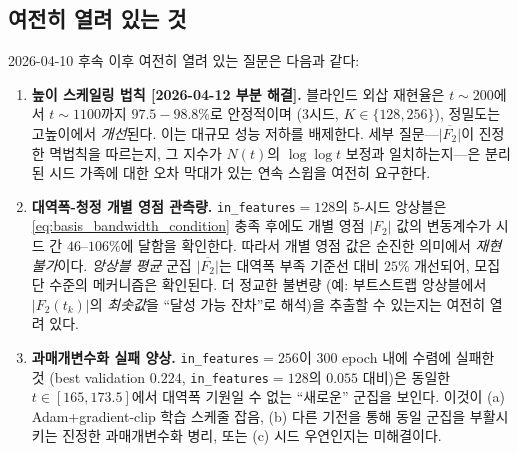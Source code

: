\documentclass[11pt, a4paper]{article}
\theoremstyle{definition}
\theoremstyle{plain}
\begin{document}
\subsection{여전히 열려 있는 것}
\label{sec:f2_residual_open}

2026-04-10 후속 이후 여전히 열려 있는 질문은 다음과 같다:
\begin{enumerate}
  \item \textbf{높이 스케일링 법칙
        [2026-04-12 부분 해결].}
        블라인드 외삽 재현율은 $t{\sim}200$에서 $t{\sim}1100$까지
        $97.5{-}98.8\%$로 안정적이며 (3시드, $K\in\{128,256\}$),
        정밀도는 고높이에서 \emph{개선}된다. 이는 대규모 성능 저하를
        배제한다. 세부 질문---$\overline{|F_2|}$이 진정한 멱법칙을
        따르는지, 그 지수가 $N(t)$의 $\log\log t$ 보정과
        일치하는지---은 분리된 시드 가족에 대한 오차 막대가 있는
        연속 스윕을 여전히 요구한다.
  \item \textbf{대역폭-청정 개별 영점 관측량.} \texttt{in\_features}$=128$의 5-시드 앙상블은 \eqref{eq:basis_bandwidth_condition} 충족 후에도 개별 영점 $|F_2|$ 값의 변동계수가 시드 간 $46$--$106\%$에 달함을 확인한다. 따라서 개별 영점 값은 순진한 의미에서 \emph{재현 불가}이다. \emph{앙상블 평균} 군집 $\overline{|F_2|}$는 대역폭 부족 기준선 대비 $25\%$ 개선되어, 모집단 수준의 메커니즘은 확인된다. 더 정교한 불변량 (예: 부트스트랩 앙상블에서 $|F_2(t_k)|$의 \emph{최솟값}을 ``달성 가능 잔차''로 해석)을 추출할 수 있는지는 여전히 열려 있다.
  \item \textbf{과매개변수화 실패 양상.} \texttt{in\_features}$=256$이 $300$ epoch 내에 수렴에 실패한 것 (best validation $0.224$, \texttt{in\_features}$=128$의 $0.055$ 대비)은 동일한 $t\in[165,173.5]$에서 대역폭 기원일 수 없는 ``새로운'' 군집을 보인다. 이것이 (a) Adam+gradient-clip 학습 스케줄 잡음, (b) 다른 기전을 통해 동일 군집을 부활시키는 진정한 과매개변수화 병리, 또는 (c) 시드 우연인지는 미해결이다.
\end{enumerate}
\end{document}
